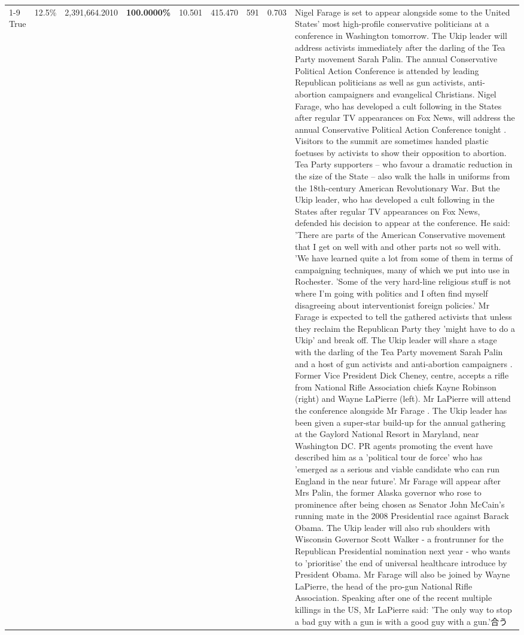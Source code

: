 \begin{table}[H]
\begin{tabular}{lllrlllll}
\cline{1-9}
True & 12.5\% & 2,391,664.2010 & \bfseries \color{red} 100.0000\% & 10.501 & 415.470 & 591 & 0.703 & Nigel Farage is set to appear alongside some to the United States' most high-profile conservative politicians at a conference in Washington tomorrow. The Ukip leader will address activists immediately after the darling of the Tea Party movement Sarah Palin. The annual Conservative Political Action Conference is attended by leading Republican politicians as well as gun activists, anti-abortion campaigners and evangelical Christians. Nigel Farage, who has developed a cult following in the States after regular TV appearances on Fox News, will address the annual Conservative Political Action Conference tonight . Visitors to the summit are sometimes handed plastic foetuses by activists to show their opposition to abortion. Tea Party supporters – who favour a dramatic reduction in the size of the State – also walk the halls in uniforms from the 18th-century American Revolutionary War. But the Ukip leader, who has developed a cult following in the States after regular TV appearances on Fox News, defended his decision to appear at the conference. He said: 'There are parts of the American Conservative movement that I get on well with and other parts not so well with. 'We have learned quite a lot from some of them in terms of campaigning techniques, many of which we put into use in Rochester. 'Some of the very hard-line religious stuff is not where I'm going with politics and I often find myself disagreeing about interventionist foreign policies.' Mr Farage is expected to tell the gathered activists that unless they reclaim the Republican Party they 'might have to do a Ukip' and break off. The Ukip leader will share a stage with the darling of the Tea Party movement Sarah Palin and a host of gun activists and anti-abortion campaigners . Former Vice President Dick Cheney, centre, accepts a rifle from National Rifle Association chiefs Kayne Robinson (right) and Wayne LaPierre (left). Mr LaPierre will attend the conference alongside Mr Farage . The Ukip leader has been given a super-star build-up for the annual gathering at the Gaylord National Resort in Maryland, near Washington DC. PR agents promoting the event have described him as a 'political tour de force' who has 'emerged as a serious and viable candidate who can run England in the near future'. Mr Farage will appear after Mrs Palin, the former Alaska governor who rose to prominence after being chosen as Senator John McCain's running mate in the 2008 Presidential race against Barack Obama. The Ukip leader will also rub shoulders with Wisconsin Governor Scott Walker - a frontrunner for the Republican Presidential nomination next year - who wants to 'prioritise' the end of universal healthcare introduce by President Obama. Mr Farage will also be joined by Wayne LaPierre, the head of the pro-gun National Rifle Association. Speaking after one of the recent multiple killings in the US, Mr LaPierre said: 'The only way to stop a bad guy with a gun is with a good guy with a gun.'合う \\

\end{tabular}
\end{table}
